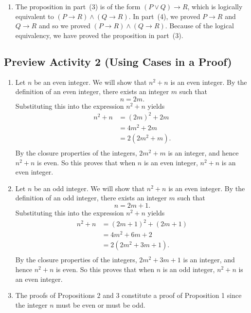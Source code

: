 \begin{enumerate}
\item The proposition in part~(3) is of the form $(P \vee Q) \to R$, which is logically equivalent to 
$( {P \to R} ) \wedge ( {Q \to R} )$.  In part~(4), we proved $P \to R$ and $Q \to R$ and so we proved 
$( {P \to R} ) \wedge ( {Q \to R} )$.  Because of the logical equivalency, we have proved the proposition in part~(3).



\end{enumerate}
\hbreak


\subsection*{Preview Activity 2 (Using Cases in a Proof)}

\begin{enumerate}
\item Let  $n$  be an even integer.  We will show that  $n^2  + n$  is an even integer.  By the definition of an even integer, there exists an integer  $m$  such that
\[
n = 2m.
\]
Substituting this into the expression  $n^2  + n$  yields
\[
\begin{aligned}
  n^2  + n &= ( {2m} )^2  + 2m \\ 
           &= 4m^2  + 2m \\ 
           &= 2( {2m^2  + m} ). \\ 
\end{aligned} 
\]
By the closure properties of the integers,  $2m^2  + m$  is an integer, and hence   
$n^2  + n$  is even.  So this proves that  when  $n$  is an even integer, $n^2  + n$  is an even integer. \qedsymbol

\item Let  $n$  be an odd integer.  We will show that  $n^2  + n$  is an even integer.  By the definition of an odd integer, there exists an integer  $m$  such that
\[
n = 2m+1.
\]
Substituting this into the expression  $n^2  + n$  yields
\[
\begin{aligned}
  n^2  + n &= ( {2m + 1} )^2  + ( 2m+1 ) \\ 
           &= 4m^2  + 6m + 2 \\ 
           &= 2( {2m^2  + 3m + 1} ). \\ 
\end{aligned} 
\]
By the closure properties of the integers,  $2m^2  + 3m + 1$  is an integer, and hence   
$n^2  + n$  is even.  So this proves that  when  $n$  is an odd integer, $n^2  + n$  is an even integer. \qedsymbol

\item The proofs of Propositions 2 and 3 constitute a proof of Proposition 1 since the integer $n$ must be even or must be odd.
\end{enumerate}
\hbreak




\newpage

\endinput
